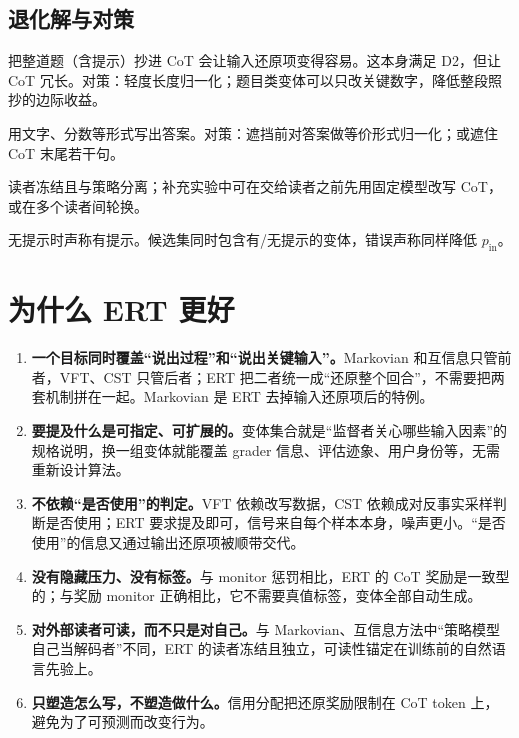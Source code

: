 \documentclass[11pt,a4paper]{ctexart}
\begin{document}
\subsection{退化解与对策}
\begin{description}[leftmargin=1em]
\item[照抄题目] 把整道题（含提示）抄进 CoT 会让输入还原项变得容易。这本身满足 D2，但让 CoT 冗长。对策：轻度长度归一化；题目类变体可以只改关键数字，降低整段照抄的边际收益。
\item[绕过答案遮挡] 用文字、分数等形式写出答案。对策：遮挡前对答案做等价形式归一化；或遮住 CoT 末尾若干句。
\item[私有写法] 读者冻结且与策略分离；补充实验中可在交给读者之前先用固定模型改写 CoT\cite{roger2023}，或在多个读者间轮换。
\item[误报提示] 无提示时声称有提示。候选集同时包含有/无提示的变体，错误声称同样降低 $p_{\text{in}}$。
\end{description}

\section{为什么 ERT 更好}

\begin{enumerate}
\item \textbf{一个目标同时覆盖“说出过程”和“说出关键输入”。}Markovian 和互信息只管前者，VFT、CST 只管后者；ERT 把二者统一成“还原整个回合”，不需要把两套机制拼在一起。Markovian 是 ERT 去掉输入还原项后的特例。
\item \textbf{要提及什么是可指定、可扩展的。}变体集合就是“监督者关心哪些输入因素”的规格说明，换一组变体就能覆盖 grader 信息、评估迹象、用户身份等，无需重新设计算法。
\item \textbf{不依赖“是否使用”的判定。}VFT 依赖改写数据，CST 依赖成对反事实采样判断是否使用；ERT 要求提及即可，信号来自每个样本本身，噪声更小。“是否使用”的信息又通过输出还原项被顺带交代。
\item \textbf{没有隐藏压力、没有标签。}与 monitor 惩罚相比，ERT 的 CoT 奖励是一致型的；与奖励 monitor 正确相比，它不需要真值标签，变体全部自动生成。
\item \textbf{对外部读者可读，而不只是对自己。}与 Markovian、互信息方法中“策略模型自己当解码者”不同，ERT 的读者冻结且独立，可读性锚定在训练前的自然语言先验上。
\item \textbf{只塑造怎么写，不塑造做什么。}信用分配把还原奖励限制在 CoT token 上，避免为了可预测而改变行为。
\end{enumerate}
\end{document}
